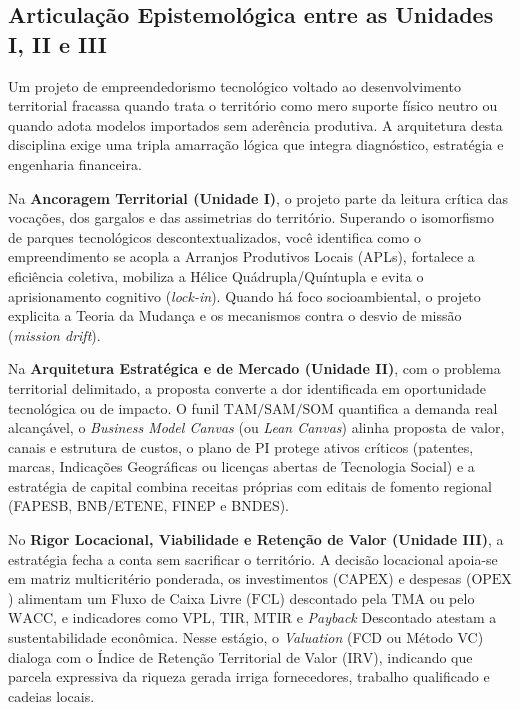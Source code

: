 \subsection{Articulação Epistemológica entre as Unidades I, II e III}

Um projeto de empreendedorismo tecnológico voltado ao desenvolvimento territorial fracassa quando trata o território como mero suporte físico neutro ou quando adota modelos importados sem aderência produtiva. A arquitetura desta disciplina exige uma tripla amarração lógica que integra diagnóstico, estratégia e engenharia financeira.

Na \textbf{Ancoragem Territorial (Unidade I)}, o projeto parte da leitura crítica das vocações, dos gargalos e das assimetrias do território. Superando o isomorfismo de parques tecnológicos descontextualizados, você identifica como o empreendimento se acopla a Arranjos Produtivos Locais (APLs), fortalece a eficiência coletiva, mobiliza a Hélice Quádrupla/Quíntupla e evita o aprisionamento cognitivo (\textit{lock-in}). Quando há foco socioambiental, o projeto explicita a Teoria da Mudança e os mecanismos contra o desvio de missão (\textit{mission drift}).

Na \textbf{Arquitetura Estratégica e de Mercado (Unidade II)}, com o problema territorial delimitado, a proposta converte a dor identificada em oportunidade tecnológica ou de impacto. O funil $\text{TAM/SAM/SOM}$ quantifica a demanda real alcançável, o \textit{Business Model Canvas} (ou \textit{Lean Canvas}) alinha proposta de valor, canais e estrutura de custos, o plano de PI protege ativos críticos (patentes, marcas, Indicações Geográficas ou licenças abertas de Tecnologia Social) e a estratégia de capital combina receitas próprias com editais de fomento regional (FAPESB, BNB/ETENE, FINEP e BNDES).

No \textbf{Rigor Locacional, Viabilidade e Retenção de Valor (Unidade III)}, a estratégia fecha a conta sem sacrificar o território. A decisão locacional apoia-se em matriz multicritério ponderada, os investimentos ($\text{CAPEX}$) e despesas ($\text{OPEX}$) alimentam um Fluxo de Caixa Livre ($\text{FCL}$) descontado pela $\text{TMA}$ ou pelo $\text{WACC}$, e indicadores como $\text{VPL}$, $\text{TIR}$, $\text{MTIR}$ e \textit{Payback} Descontado atestam a sustentabilidade econômica. Nesse estágio, o \textit{Valuation} (FCD ou Método VC) dialoga com o Índice de Retenção Territorial de Valor ($\text{IRV}$), indicando que parcela expressiva da riqueza gerada irriga fornecedores, trabalho qualificado e cadeias locais.

